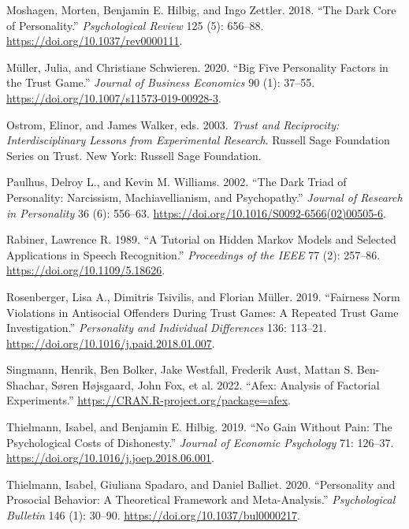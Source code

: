 \documentclass[
]{article}
\newlength{\cslhangindent}
\newenvironment{CSLReferences}[2] %
 {\begin{list}{}{%
  \setlength{\itemindent}{0pt}
  \setlength{\leftmargin}{0pt}
  \setlength{\parsep}{0pt}
  \ifodd #1
   \setlength{\leftmargin}{\cslhangindent}
   \setlength{\itemindent}{-1\cslhangindent}
  \fi
  \setlength{\itemsep}{#2\baselineskip}}}
 {\end{list}}
\begin{document}
\begin{CSLReferences}{1}{0}
Moshagen, Morten, Benjamin E. Hilbig, and Ingo Zettler. 2018. {``The Dark Core of Personality.''} \emph{Psychological Review} 125 (5): 656--88. \url{https://doi.org/10.1037/rev0000111}.

Müller, Julia, and Christiane Schwieren. 2020. {``Big Five Personality Factors in the Trust Game.''} \emph{Journal of Business Economics} 90 (1): 37--55. \url{https://doi.org/10.1007/s11573-019-00928-3}.

Ostrom, Elinor, and James Walker, eds. 2003. \emph{Trust and Reciprocity: Interdisciplinary Lessons from Experimental Research}. Russell Sage Foundation Series on Trust. New York: Russell Sage Foundation.

Paulhus, Delroy L., and Kevin M. Williams. 2002. {``The Dark Triad of Personality: Narcissism, Machiavellianism, and Psychopathy.''} \emph{Journal of Research in Personality} 36 (6): 556--63. \url{https://doi.org/10.1016/S0092-6566(02)00505-6}.

Rabiner, Lawrence R. 1989. {``A Tutorial on Hidden Markov Models and Selected Applications in Speech Recognition.''} \emph{Proceedings of the IEEE} 77 (2): 257--86. \url{https://doi.org/10.1109/5.18626}.

Rosenberger, Lisa A., Dimitris Tsivilis, and Florian Müller. 2019. {``Fairness Norm Violations in Antisocial Offenders During Trust Games: {A} Repeated Trust Game Investigation.''} \emph{Personality and Individual Differences} 136: 113--21. \url{https://doi.org/10.1016/j.paid.2018.01.007}.

Singmann, Henrik, Ben Bolker, Jake Westfall, Frederik Aust, Mattan S. Ben-Shachar, Søren Højsgaard, John Fox, et al. 2022. {``Afex: Analysis of Factorial Experiments.''} \url{https://CRAN.R-project.org/package=afex}.

Thielmann, Isabel, and Benjamin E. Hilbig. 2019. {``No Gain Without Pain: {The} Psychological Costs of Dishonesty.''} \emph{Journal of Economic Psychology} 71: 126--37. \url{https://doi.org/10.1016/j.joep.2018.06.001}.

Thielmann, Isabel, Giuliana Spadaro, and Daniel Balliet. 2020. {``Personality and Prosocial Behavior: A Theoretical Framework and Meta-Analysis.''} \emph{Psychological Bulletin} 146 (1): 30--90. \url{https://doi.org/10.1037/bul0000217}.


\end{CSLReferences}
\end{document}
